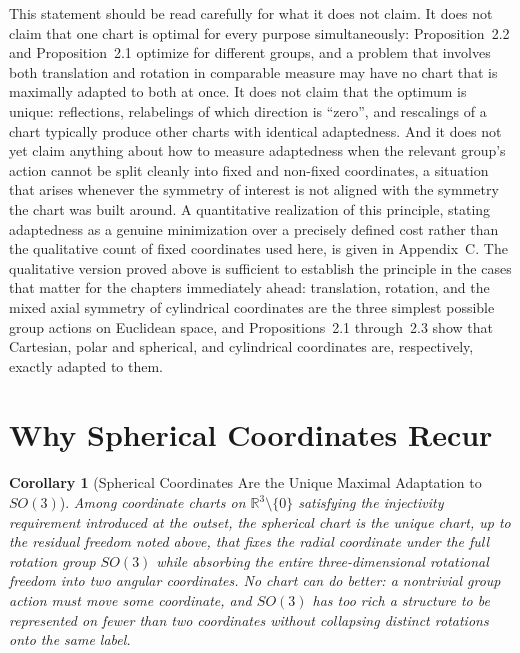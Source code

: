 \documentclass[11pt,fleqn]{book}
\numberwithin{equation}{chapter}
\theoremstyle{plain}
\newtheorem{corollary}[theorem]{Corollary}
\theoremstyle{definition}
\theoremstyle{remark}
\newcommand{\R}{\mathbb{R}}
\providecommand{\enquote}[1]{``#1''}
\begin{document}
This statement should be read carefully for what it does not claim. It does not claim that one chart is optimal for every purpose simultaneously: Proposition~2.2 and Proposition~2.1 optimize for different groups, and a problem that involves both translation and rotation in comparable measure may have no chart that is maximally adapted to both at once. It does not claim that the optimum is unique: reflections, relabelings of which direction is \enquote{zero}, and rescalings of a chart typically produce other charts with identical adaptedness. And it does not yet claim anything about how to measure adaptedness when the relevant group's action cannot be split cleanly into fixed and non-fixed coordinates, a situation that arises whenever the symmetry of interest is not aligned with the symmetry the chart was built around. A quantitative realization of this principle, stating adaptedness as a genuine minimization over a precisely defined cost rather than the qualitative count of fixed coordinates used here, is given in Appendix~C. The qualitative version proved above is sufficient to establish the principle in the cases that matter for the chapters immediately ahead: translation, rotation, and the mixed axial symmetry of cylindrical coordinates are the three simplest possible group actions on Euclidean space, and Propositions~2.1 through~2.3 show that Cartesian, polar and spherical, and cylindrical coordinates are, respectively, exactly adapted to them.

\section{Why Spherical Coordinates Recur}

\begin{corollary}[Spherical Coordinates Are the Unique Maximal Adaptation to \(SO(3)\)]
Among coordinate charts on \(\R^3\setminus\{0\}\) satisfying the injectivity requirement introduced at the outset, the spherical chart is the unique chart, up to the residual freedom noted above, that fixes the radial coordinate under the full rotation group \(SO(3)\) while absorbing the entire three-dimensional rotational freedom into two angular coordinates. No chart can do better: a nontrivial group action must move some coordinate, and \(SO(3)\) has too rich a structure to be represented on fewer than two coordinates without collapsing distinct rotations onto the same label.
\end{corollary}
\end{document}
